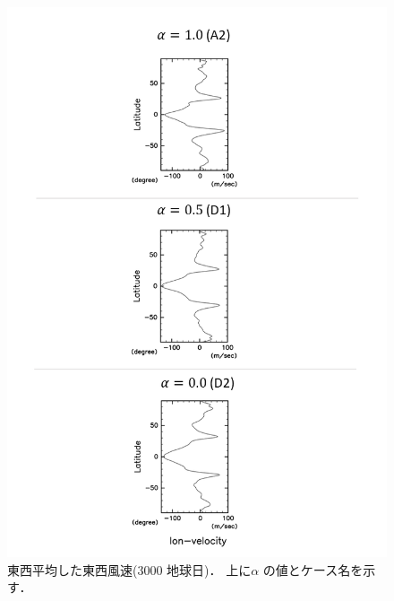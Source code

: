 \documentclass[a4j,12pt,openbib,oneside]{jreport}
\begin{document}
\clearpage
%
%
\begin{figure}[ht]
  \begin{center}
    \includegraphics[clip,width=14cm]{./fig/result/case3/case3_vellon.png}
    \caption{
      \footnotesize{東西平均した東西風速(3000 地球日)．
上に$\alpha$ の値とケース名を示す．
      }
    }
    \label{fig:case3_vellon}
  \end{center}
\end{figure}
%
%
\clearpage
\newpage
\end{document}
